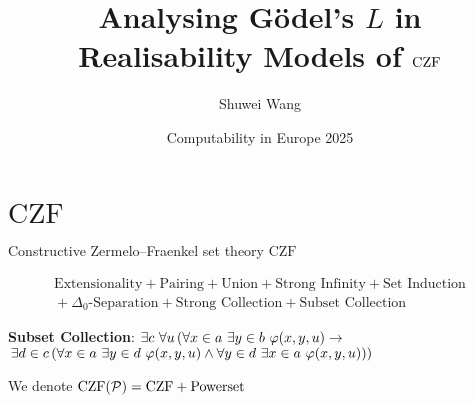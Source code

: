 \documentclass{beamer}
\title{Analysing G\"odel's \texorpdfstring{$L$}{L} in Realisability Models of \texorpdfstring{$\CZF$}{CZF}}
\author{Shuwei Wang}
\institute{University of Leeds}
\date{{\small Computability in Europe 2025}\\\DTMdate{2025-07-14}}
\newtheorem{proposition}{Proposition}
\theoremstyle{definition}
\newcommand{\CZF}{\mathrm{CZF}}
\newcommand{\CZFP}{\CZF\mleft(\mathcal{P}\mright)}
\begin{document}
\begin{frame}
  \titlepage
\end{frame}

\section{\texorpdfstring{$\CZF$}{CZF}}

\begin{frame}{Constructive Zermelo--Fraenkel set theory $\CZF$}
  \nocite{aczel-rathjen10-cst-book}

  \vspace{-2em}
  \begin{gather*}
    \text{Extensionality} + \text{Pairing} + \text{Union} + \text{Strong Infinity} + \text{Set Induction} \\
    {} + \Delta_0\text{-Separation} + \text{Strong Collection} + \text{Subset Collection}
  \end{gather*}

  \pause


  \vspace{0.6em}
  \textbf{Subset Collection}: $\exists c \ \forall u \left(\forall x \in a \ \exists y \in b \ \varphi\mleft(x, y, u\mright) \rightarrow {}\right.$ \\
    \quad $\left.\exists d \in c \left(\forall x \in a \ \exists y \in d \ \varphi\mleft(x, y, u\mright) \land \forall y \in d \ \exists x \in a \ \varphi\mleft(x, y, u\mright)\right)\right)$

  \pause


  \vspace{1em}
  We denote $\CZFP = \CZF + \text{Powerset}$
\end{frame}
\end{document}
